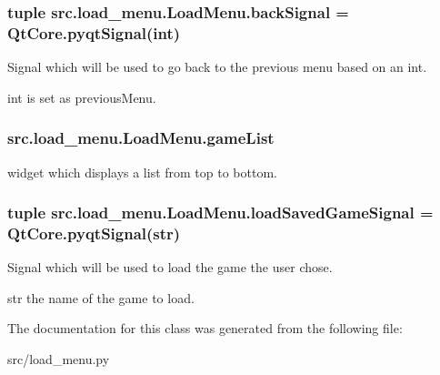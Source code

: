 \subsubsection[{back\+Signal}]{\setlength{\rightskip}{0pt plus 5cm}tuple src.\+load\+\_\+menu.\+Load\+Menu.\+back\+Signal = Qt\+Core.\+pyqt\+Signal(int)\hspace{0.3cm}{\ttfamily [static]}}\label{classsrc_1_1load__menu_1_1_load_menu_a213d15dc1a4c3b77947ea334896268c5}


Signal which will be used to go back to the previous menu based on an int. 

int is set as \textquotesingle{}previous\+Menu\textquotesingle{}. \hypertarget{classsrc_1_1load__menu_1_1_load_menu_af17d0436c9ca2ece0594fbcfd6380162}{}
\subsubsection[{game\+List}]{\setlength{\rightskip}{0pt plus 5cm}src.\+load\+\_\+menu.\+Load\+Menu.\+game\+List}\label{classsrc_1_1load__menu_1_1_load_menu_af17d0436c9ca2ece0594fbcfd6380162}


widget which displays a list from top to bottom. 

\hypertarget{classsrc_1_1load__menu_1_1_load_menu_a9f994468ddeb9d648ce5a68c001fbb36}{}
\subsubsection[{load\+Saved\+Game\+Signal}]{\setlength{\rightskip}{0pt plus 5cm}tuple src.\+load\+\_\+menu.\+Load\+Menu.\+load\+Saved\+Game\+Signal = Qt\+Core.\+pyqt\+Signal(str)\hspace{0.3cm}{\ttfamily [static]}}\label{classsrc_1_1load__menu_1_1_load_menu_a9f994468ddeb9d648ce5a68c001fbb36}


Signal which will be used to load the game the user chose. 

str the name of the game to load. 

The documentation for this class was generated from the following file\+:\begin{DoxyCompactItemize}
\item 
src/load\+\_\+menu.\+py\end{DoxyCompactItemize}
